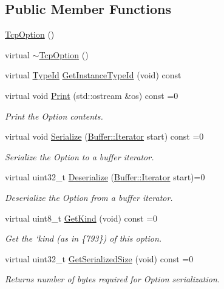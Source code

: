 \subsection*{Public Member Functions}
\begin{DoxyCompactItemize}
\item 
\hyperlink{classns3_1_1TcpOption_addb362ad11c648a1c1929d8c841a611f}{Tcp\+Option} ()
\item 
virtual \hyperlink{classns3_1_1TcpOption_a9d3e12e43ac74524e220327e7bfc6179}{$\sim$\+Tcp\+Option} ()
\item 
virtual \hyperlink{classns3_1_1TypeId}{Type\+Id} \hyperlink{classns3_1_1TcpOption_a11470d5f15a38426db82cdd7340565c7}{Get\+Instance\+Type\+Id} (void) const 
\item 
virtual void \hyperlink{classns3_1_1TcpOption_aa5e70d98998c808d77b6e7ba7fa094a1}{Print} (std\+::ostream \&os) const =0
\begin{DoxyCompactList}\small\item\em Print the Option contents. \end{DoxyCompactList}\item 
virtual void \hyperlink{classns3_1_1TcpOption_a8327cc829ad856643147808f32194ab5}{Serialize} (\hyperlink{classns3_1_1Buffer_1_1Iterator}{Buffer\+::\+Iterator} start) const =0
\begin{DoxyCompactList}\small\item\em Serialize the Option to a buffer iterator. \end{DoxyCompactList}\item 
virtual uint32\+\_\+t \hyperlink{classns3_1_1TcpOption_a94bfe84ac60383554b296293289d5059}{Deserialize} (\hyperlink{classns3_1_1Buffer_1_1Iterator}{Buffer\+::\+Iterator} start)=0
\begin{DoxyCompactList}\small\item\em Deserialize the Option from a buffer iterator. \end{DoxyCompactList}\item 
virtual uint8\+\_\+t \hyperlink{classns3_1_1TcpOption_a29376dfd9504f5dd47dbad652caf04f7}{Get\+Kind} (void) const =0
\begin{DoxyCompactList}\small\item\em Get the `kind\textquotesingle{} (as in \{793\}) of this option. \end{DoxyCompactList}\item 
virtual uint32\+\_\+t \hyperlink{classns3_1_1TcpOption_ac6c6b5d8905ffc2fdbe99448474c08da}{Get\+Serialized\+Size} (void) const =0
\begin{DoxyCompactList}\small\item\em Returns number of bytes required for Option serialization. \end{DoxyCompactList}\end{DoxyCompactItemize}
